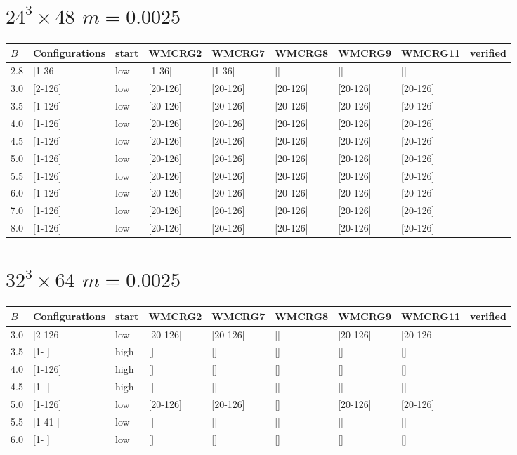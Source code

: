 \documentclass[11pt]{article}
\begin{document}
  \section{$24^3\times48$  $m=0.0025$}
    \begin{tabular}{| l | l | l | l | l | l | l | l | l |}
      \hline
      $B$ & Configurations & start & WMCRG2 & WMCRG7 & WMCRG8 & WMCRG9 & WMCRG11 & verified\\
      \hline
      2.8 & [1-36]  & low & [1-36]   & [1-36]   & [] & [] & [] &\\
      3.0 & [2-126] & low & [20-126] & [20-126] & [20-126] & [20-126] & [20-126] &\\
      3.5 & [1-126] & low & [20-126] & [20-126] & [20-126] & [20-126] & [20-126] &\\
      4.0 & [1-126] & low & [20-126] & [20-126] & [20-126] & [20-126] & [20-126] &\\
      4.5 & [1-126] & low & [20-126] & [20-126] & [20-126] & [20-126] & [20-126] &\\
      5.0 & [1-126] & low & [20-126] & [20-126] & [20-126] & [20-126] & [20-126] &\\
      5.5 & [1-126] & low & [20-126] & [20-126] & [20-126] & [20-126] & [20-126] &\\
      6.0 & [1-126] & low & [20-126] & [20-126] & [20-126] & [20-126] & [20-126] &\\
      7.0 & [1-126] & low & [20-126] & [20-126] & [20-126] & [20-126] & [20-126] &\\
      8.0 & [1-126] & low & [20-126] & [20-126] & [20-126] & [20-126] & [20-126] &\\
      \hline
    \end{tabular}
  \section{$32^3\times64$  $m=0.0025$}
    \begin{tabular}{| l | l | l | l | l | l | l | l | l |}
      \hline
      $B$ & Configurations & start & WMCRG2 & WMCRG7 & WMCRG8 & WMCRG9 & WMCRG11 & verified\\
      \hline
      3.0 & [2-126] & low  & [20-126] & [20-126] & [] & [20-126] & [20-126] &\\
      3.5 & [1-   ] & high & [] & [] & [] & [] & [] &\\
      4.0 & [1-126] & high & [] & [] & [] & [] & [] &\\
      4.5 & [1-   ] & high & [] & [] & [] & [] & [] &\\
      5.0 & [1-126] & low  & [20-126] & [20-126] & [] & [20-126] & [20-126] &\\
      5.5 & [1-41 ] & low  & [] & [] & [] & [] & [] &\\
      6.0 & [1-   ] & low  & [] & [] & [] & [] & [] &\\
      \hline
    \end{tabular}
\end{document}
